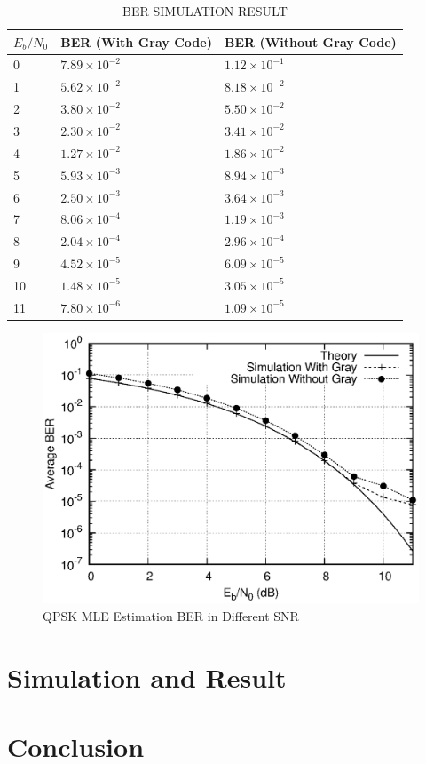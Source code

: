 \documentclass[technicalreport]{ieicej}
\begin{document}
\begin{table}[tbp]
	\begin{center}
	\caption{BER SIMULATION RESULT}
	\begin{tabular}{lll}
	\hline
	$E_{b}/N_{0}$ & BER (With Gray Code) & BER (Without Gray Code)\\
	\hline
	0	& $7.89 \times 10^{-2}$ & $1.12 \times 10^{-1}$\\
	1	& $5.62 \times 10^{-2}$ & $8.18 \times 10^{-2}$\\
	2	& $3.80 \times 10^{-2}$ & $5.50 \times 10^{-2}$\\
	3	& $2.30 \times 10^{-2}$ & $3.41 \times 10^{-2}$\\
	4	& $1.27 \times 10^{-2}$ & $1.86 \times 10^{-2}$\\
	5	& $5.93 \times 10^{-3}$ & $8.94 \times 10^{-3}$\\
	6	& $2.50 \times 10^{-3}$ & $3.64 \times 10^{-3}$\\
	7 	& $8.06 \times 10^{-4}$ & $1.19 \times 10^{-3}$\\
	8 	& $2.04 \times 10^{-4}$ & $2.96 \times 10^{-4}$\\
	9	& $4.52 \times 10^{-5}$ & $6.09 \times 10^{-5}$\\
	10	& $1.48 \times 10^{-5}$ & $3.05 \times 10^{-5}$\\
	11	& $7.80 \times 10^{-6}$ & $1.09 \times 10^{-5}$\\
	\hline
	\end{tabular}
	\end{center}
\end{table}

\begin{figure}[tbp]
	\begin{center}
		\vspace{0cm}
		\includegraphics[width=\linewidth,clip]{fig/awgn.eps}
		\caption{QPSK MLE Estimation BER in Different SNR}
		\label{fig:sample}
	\end{center}
\end{figure}

\section{Simulation and Result}


\section{Conclusion}



\end{document}
